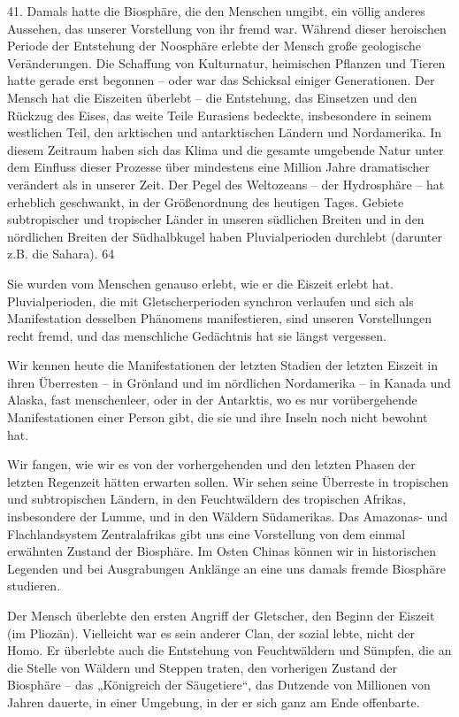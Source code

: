 \documentclass[11pt,a4paper]{book}
\begin{document}
41. Damals hatte die Biosphäre, die den Menschen umgibt, ein völlig anderes Aussehen, das unserer Vorstellung von ihr fremd war. Während dieser heroischen Periode der Entstehung der Noosphäre erlebte der Mensch große geologische Veränderungen. Die Schaffung von Kulturnatur, heimischen Pflanzen und Tieren hatte gerade erst begonnen -- oder war das Schicksal einiger Generationen. Der Mensch hat die Eiszeiten überlebt -- die Entstehung, das Einsetzen und den Rückzug des Eises, das weite Teile Eurasiens bedeckte, insbesondere in seinem westlichen Teil, den arktischen und antarktischen Ländern und Nordamerika. In diesem Zeitraum haben sich das Klima und die gesamte umgebende Natur unter dem Einfluss dieser Prozesse über mindestens eine Million Jahre dramatischer verändert als in unserer Zeit. Der Pegel des Weltozeans -- der Hydrosphäre -- hat erheblich geschwankt, in der Größenordnung des heutigen Tages. Gebiete subtropischer und tropischer Länder in unseren südlichen Breiten und in den nördlichen Breiten der Südhalbkugel haben Pluvialperioden durchlebt (darunter z.B. die Sahara). 64 

Sie wurden vom Menschen genauso erlebt, wie er die Eiszeit erlebt hat. Pluvialperioden, die mit Gletscherperioden synchron verlaufen und sich als Manifestation desselben Phänomens manifestieren, sind unseren Vorstellungen recht fremd, und das menschliche Gedächtnis hat sie längst vergessen. 

Wir kennen heute die Manifestationen der letzten Stadien der letzten Eiszeit in ihren Überresten -- in Grönland und im nördlichen Nordamerika -- in Kanada und Alaska, fast menschenleer, oder in der Antarktis, wo es nur vorübergehende Manifestationen einer Person gibt, die sie und ihre Inseln noch nicht bewohnt hat. 

Wir fangen, wie wir es von der vorhergehenden und den letzten Phasen der letzten Regenzeit hätten erwarten sollen. Wir sehen seine Überreste in tropischen und subtropischen Ländern, in den Feuchtwäldern des tropischen Afrikas, insbesondere der Lumme, und in den Wäldern Südamerikas. Das Amazonas- und Flachlandsystem Zentralafrikas gibt uns eine Vorstellung von dem einmal erwähnten Zustand der Biosphäre. Im Osten Chinas können wir in historischen Legenden und bei Ausgrabungen Anklänge an eine uns damals fremde Biosphäre studieren. 

Der Mensch überlebte den ersten Angriff der Gletscher, den Beginn der Eiszeit (im Pliozän). Vielleicht war es sein anderer Clan, der sozial lebte, nicht der Homo. Er überlebte auch die Entstehung von Feuchtwäldern und Sümpfen, die an die Stelle von Wäldern und Steppen traten, den vorherigen Zustand der Biosphäre -- das „Königreich der Säugetiere“, das Dutzende von Millionen von Jahren dauerte, in einer Umgebung, in der er sich ganz am Ende offenbarte. 
\end{document}
